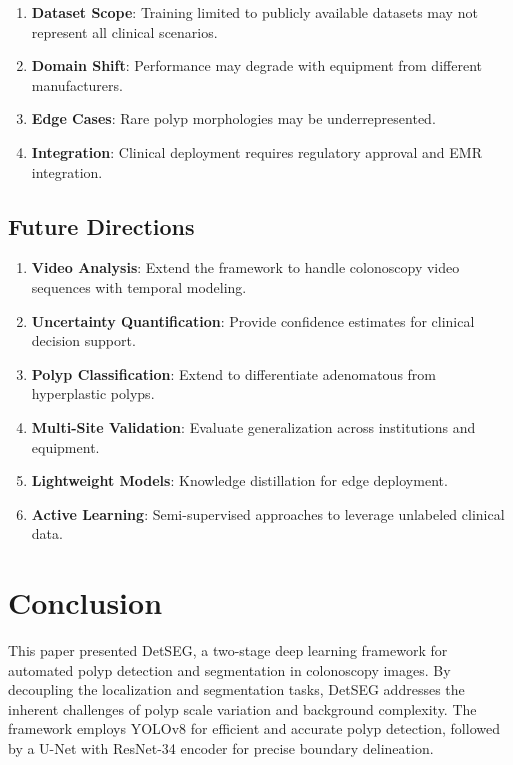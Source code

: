 \documentclass[conference]{IEEEtran}
\begin{document}
\begin{enumerate}
    \item \textbf{Dataset Scope}: Training limited to publicly available datasets may not represent all clinical scenarios.
    \item \textbf{Domain Shift}: Performance may degrade with equipment from different manufacturers.
    \item \textbf{Edge Cases}: Rare polyp morphologies may be underrepresented.
    \item \textbf{Integration}: Clinical deployment requires regulatory approval and EMR integration.
\end{enumerate}

\subsection{Future Directions}

\begin{enumerate}
    \item \textbf{Video Analysis}: Extend the framework to handle colonoscopy video sequences with temporal modeling.
    \item \textbf{Uncertainty Quantification}: Provide confidence estimates for clinical decision support.
    \item \textbf{Polyp Classification}: Extend to differentiate adenomatous from hyperplastic polyps.
    \item \textbf{Multi-Site Validation}: Evaluate generalization across institutions and equipment.
    \item \textbf{Lightweight Models}: Knowledge distillation for edge deployment.
    \item \textbf{Active Learning}: Semi-supervised approaches to leverage unlabeled clinical data.
\end{enumerate}

\section{Conclusion}

This paper presented DetSEG, a two-stage deep learning framework for automated polyp detection and segmentation in colonoscopy images. By decoupling the localization and segmentation tasks, DetSEG addresses the inherent challenges of polyp scale variation and background complexity. The framework employs YOLOv8 for efficient and accurate polyp detection, followed by a U-Net with ResNet-34 encoder for precise boundary delineation.
\end{document}
